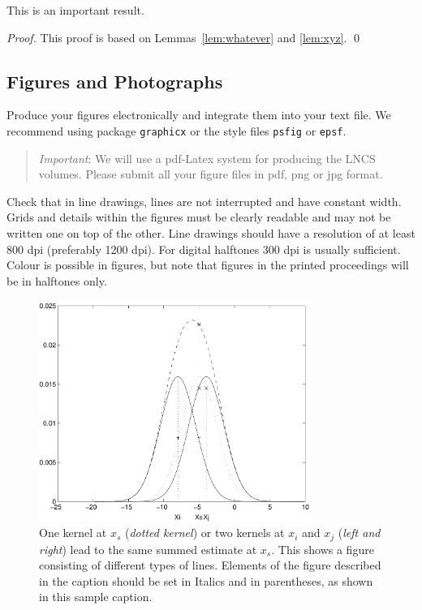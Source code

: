 \documentclass[runningheads]{llncs}
\begin{document}
\begin{theorem}
This is an important result.
\end{theorem}

\begin{proof}
This proof is based on Lemmas~\ref{lem:whatever} and \ref{lem:xyz}.
\qed
\end{proof}

\subsection{Figures and Photographs}
\label{sect:figures}

Produce your figures electronically and integrate
them into your text file. We recommend using package
\verb+graphicx+ or the style files \verb+psfig+ or \verb+epsf+.

\begin{quote}
{\it Important}: We will use a pdf-Latex system for producing the LNCS volumes.
Please submit all your figure files in pdf, png or jpg format.
\end{quote}

Check that in line drawings, lines are not
interrupted and have constant width. Grids and details within the
figures must be clearly readable and may not be written one on top of
the other. Line drawings should have a resolution of at least 800 dpi
(preferably 1200 dpi).
For digital halftones 300 dpi is usually sufficient. Colour is possible in
figures, but note that figures in the printed proceedings will be in
halftones only.

\begin{figure}
\centering
\includegraphics[height=72mm]{eijkel2}
\caption{
One kernel at $x_s$ ({\it dotted kernel}) or two kernels at
$x_i$ and $x_j$ ({\it left and right}) lead to the same summed estimate
at $x_s$. This shows a figure consisting of different types of
lines. Elements of the figure described in the caption should be set in
Italics and in parentheses, as shown in this sample caption.
}
\label{fig:example}
\end{figure}
\end{document}

